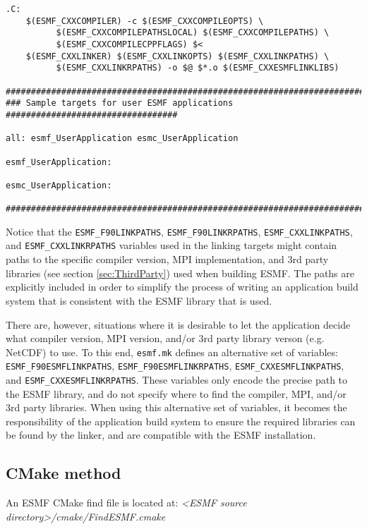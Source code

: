 \begin{verbatim}
.C:
	$(ESMF_CXXCOMPILER) -c $(ESMF_CXXCOMPILEOPTS) \
          $(ESMF_CXXCOMPILEPATHSLOCAL) $(ESMF_CXXCOMPILEPATHS) \
          $(ESMF_CXXCOMPILECPPFLAGS) $<
	$(ESMF_CXXLINKER) $(ESMF_CXXLINKOPTS) $(ESMF_CXXLINKPATHS) \
          $(ESMF_CXXLINKRPATHS) -o $@ $*.o $(ESMF_CXXESMFLINKLIBS)

################################################################################
### Sample targets for user ESMF applications ##################################

all: esmf_UserApplication esmc_UserApplication

esmf_UserApplication:

esmc_UserApplication:

################################################################################

\end{verbatim}

Notice that the {\tt ESMF\_F90LINKPATHS}, {\tt ESMF\_F90LINKRPATHS}, 
{\tt ESMF\_CXXLINKPATHS}, and {\tt ESMF\_CXXLINKRPATHS} variables used in the
linking targets might contain paths to the specific compiler version, MPI
implementation, and 3rd party libraries (see section \ref{sec:ThirdParty})
used when building ESMF. The paths are explicitly included in order to 
simplify the process of writing an application build system that is consistent
with the ESMF library that is used.

There are, however, situations where it is
desirable to let the application decide what compiler version, MPI version, 
and/or 3rd party library verson (e.g. NetCDF) to use. To this end, {\tt esmf.mk}
defines an alternative set of variables: {\tt ESMF\_F90ESMFLINKPATHS}, 
{\tt ESMF\_F90ESMFLINKRPATHS}, {\tt ESMF\_CXXESMFLINKPATHS}, and 
{\tt ESMF\_CXXESMFLINKRPATHS}. These variables only encode the precise path to
the ESMF library, and do not specify where to find the compiler, MPI, and/or 
3rd party libraries. When using this alternative set of variables, it becomes
the responsibility of the application build system to ensure the required
libraries can be found by the linker, and are compatible with the ESMF
installation.


\subsection{CMake method}

An ESMF CMake find file is located at: \textit{<ESMF source directory>/cmake/FindESMF.cmake}

